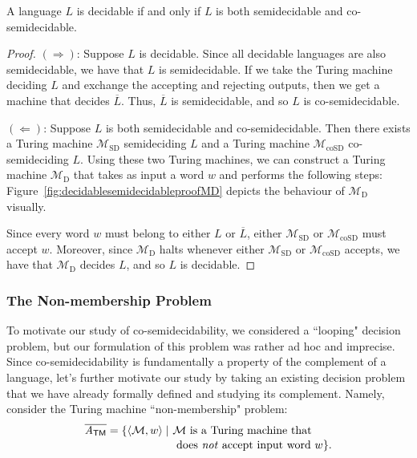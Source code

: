 \begin{theorem}\label{thm:decidablesemidecidable}
A language $L$ is decidable if and only if $L$ is both semidecidable and co-semidecidable.

\begin{proof}
$(\Rightarrow)$: Suppose $L$ is decidable. Since all decidable languages are also semidecidable, we have that $L$ is semidecidable. If we take the Turing machine deciding $L$ and exchange the accepting and rejecting outputs, then we get a machine that decides $\overline{L}$. Thus, $\overline{L}$ is semidecidable, and so $L$ is co-semidecidable.

$(\Leftarrow)$: Suppose $L$ is both semidecidable and co-semidecidable. Then there exists a Turing machine $\mathcal{M}_{\text{SD}}$ semideciding $L$ and a Turing machine $\mathcal{M}_{\text{coSD}}$ co-semideciding $L$. Using these two Turing machines, we can construct a Turing machine $\mathcal{M}_{\text{D}}$ that takes as input a word $w$ and performs the following steps:
\noindent
Figure~\ref{fig:decidablesemidecidableproofMD} depicts the behaviour of $\mathcal{M}_{\text{D}}$ visually.

Since every word $w$ must belong to either $L$ or $\overline{L}$, either $\mathcal{M}_{\text{SD}}$ or $\mathcal{M}_{\text{coSD}}$ must accept $w$. Moreover, since $\mathcal{M}_{\text{D}}$ halts whenever either $\mathcal{M}_{\text{SD}}$ or $\mathcal{M}_{\text{coSD}}$ accepts, we have that $\mathcal{M}_{\text{D}}$ decides $L$, and so $L$ is decidable.
\end{proof}
\end{theorem}

\subsubsection*{The Non-membership Problem}

To motivate our study of co-semidecidability, we considered a ``looping" decision problem, but our formulation of this problem was rather ad hoc and imprecise. Since co-semidecidability is fundamentally a property of the complement of a language, let's further motivate our study by taking an existing decision problem that we have already formally defined and studying its complement. Namely, consider the Turing machine ``non-membership" problem:
\begin{align*}
\overline{\mathit{A}_{\TM}} = \{\langle \mathcal{M}, w \rangle \mid \ & \mathcal{M} \text{ is a Turing machine that} \\[-0.2em]
	&\text{ does \emph{not} accept input word } w\}.
\end{align*}


